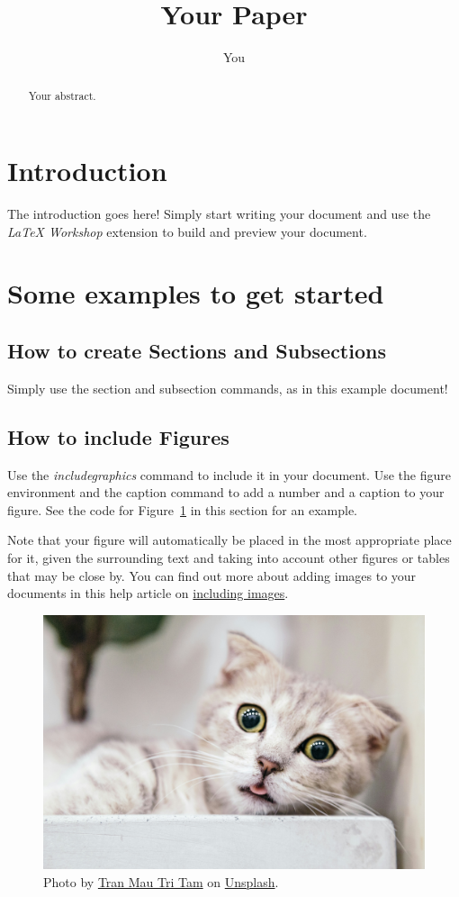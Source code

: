 \documentclass{article}
\title{Your Paper}
\author{You}
\begin{document}
\maketitle

\begin{abstract}
  Your abstract.
\end{abstract}


\section{Introduction}

The introduction goes here! Simply start writing your document and use the \textit{LaTeX Workshop} extension to build and preview your document.

\section{Some examples to get started}

\subsection{How to create Sections and Subsections}

Simply use the section and subsection commands, as in this example document!

\subsection{How to include Figures}

Use the \textit{includegraphics} command to include it in your document. Use the figure environment and the caption command to add a number and a caption to your figure. See the code for Figure~\ref{fig:cat} in this section for an example.

Note that your figure will automatically be placed in the most appropriate place for it, given the surrounding text and taking into account other figures or tables that may be close by. You can find out more about adding images to your documents in this help article on \href{https://www.overleaf.com/learn/how-to/Including_images_on_Overleaf}{including images}.

\begin{figure}[h]
  \centering
  \includegraphics[width=0.6\linewidth]{cat.jpg}
  \caption{\label{fig:cat}Photo by \href{https://unsplash.com/@tranmautritam?utm_content=creditCopyText&utm_medium=referral&utm_source=unsplash}{Tran Mau Tri Tam} on \href{https://unsplash.com/photos/brown-tabby-cat-FbhNdD1ow2g?utm_content=creditCopyText&utm_medium=referral&utm_source=unsplash}{Unsplash}.}
\end{figure}
\end{document}
